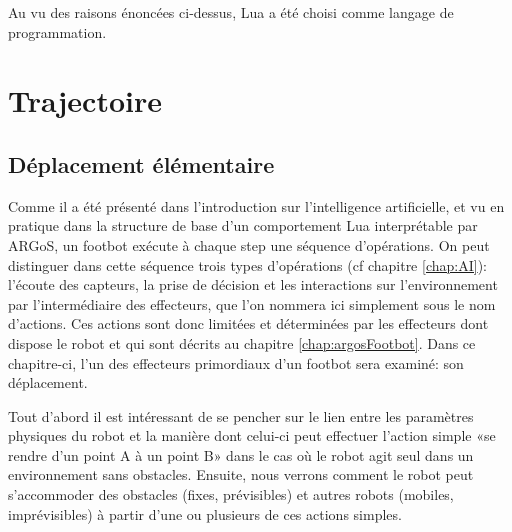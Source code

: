 \documentclass[a4paper,12pt]{report}
\begin{document}
Au vu des raisons énoncées ci-dessus, Lua a été choisi comme langage de programmation. 

\chapter{Trajectoire}

\section{Déplacement élémentaire}

Comme il a été présenté dans l'introduction sur l'intelligence artificielle, et vu en pratique dans la structure de base d'un comportement Lua interprétable par ARGoS, un footbot exécute à chaque step une séquence d'opérations. On peut distinguer dans cette séquence trois types d'opérations (cf chapitre \ref{chap:AI}): l'écoute des capteurs, la prise de décision et les interactions sur l'environnement par l'intermédiaire des effecteurs, que l'on nommera ici simplement sous le nom d'actions. Ces actions sont donc limitées et déterminées par les effecteurs dont dispose le robot et qui sont décrits au chapitre \ref{chap:argosFootbot}. Dans ce chapitre-ci, l'un des effecteurs primordiaux d'un footbot sera examiné: son déplacement.

Tout d'abord il est intéressant de se pencher sur le lien entre les paramètres physiques du robot et la manière dont celui-ci peut effectuer l'action simple «se rendre d'un point A à un point B» dans le cas où le robot agit seul dans un environnement sans obstacles. Ensuite, nous verrons comment le robot peut s’accommoder des obstacles (fixes, prévisibles) et autres robots (mobiles, imprévisibles) à partir d'une ou plusieurs de ces actions simples.
\end{document}
